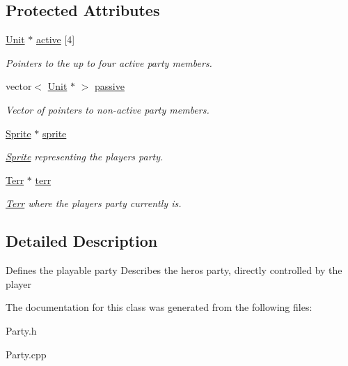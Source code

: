 \subsection*{Protected Attributes}
\begin{DoxyCompactItemize}
\item 
\hyperlink{class_unit}{Unit} $\ast$ \hyperlink{class_party_aca0245ec21a99d76c4f1d00b7299629a}{active} \mbox{[}4\mbox{]}\hypertarget{class_party_aca0245ec21a99d76c4f1d00b7299629a}{}\label{class_party_aca0245ec21a99d76c4f1d00b7299629a}

\begin{DoxyCompactList}\small\item\em Pointers to the up to four active party members. \end{DoxyCompactList}\item 
vector$<$ \hyperlink{class_unit}{Unit} $\ast$ $>$ \hyperlink{class_party_ab1e00e761df6f415ed72a920d4aa9ec6}{passive}\hypertarget{class_party_ab1e00e761df6f415ed72a920d4aa9ec6}{}\label{class_party_ab1e00e761df6f415ed72a920d4aa9ec6}

\begin{DoxyCompactList}\small\item\em Vector of pointers to non-\/active party members. \end{DoxyCompactList}\item 
\hyperlink{class_sprite}{Sprite} $\ast$ \hyperlink{class_party_ae71ba8a78bc7da8b16ff861412b30adb}{sprite}\hypertarget{class_party_ae71ba8a78bc7da8b16ff861412b30adb}{}\label{class_party_ae71ba8a78bc7da8b16ff861412b30adb}

\begin{DoxyCompactList}\small\item\em \hyperlink{class_sprite}{Sprite} representing the player\textquotesingle{}s party. \end{DoxyCompactList}\item 
\hyperlink{class_terr}{Terr} $\ast$ \hyperlink{class_party_ad70099b7cc106ac51c3db1d1c90812fc}{terr}\hypertarget{class_party_ad70099b7cc106ac51c3db1d1c90812fc}{}\label{class_party_ad70099b7cc106ac51c3db1d1c90812fc}

\begin{DoxyCompactList}\small\item\em \hyperlink{class_terr}{Terr} where the player\textquotesingle{}s party currently is. \end{DoxyCompactList}\end{DoxyCompactItemize}


\subsection{Detailed Description}
Defines the playable party Describes the hero\textquotesingle{}s party, directly controlled by the player 

The documentation for this class was generated from the following files\+:\begin{DoxyCompactItemize}
\item 
Party.\+h\item 
Party.\+cpp\end{DoxyCompactItemize}
